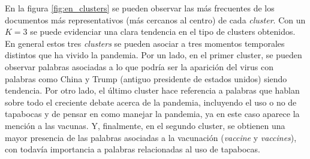 En la figura \ref{fig:en_clusters} se pueden observar las más frecuentes de los documentos más representativos (más cercanos al centro) de cada \textit{cluster}. Con un $K = 3$ se puede evidenciar una clara tendencia en el tipo de clusters obtenidos. En general estos tres \textit{clusters} se pueden asociar a tres momentos temporales distintos que ha vivido la pandemia. Por un lado, en el primer cluster, se pueden observar palabras asociadas a lo que podría ser la aparición del virus con palabras como China y Trump (antiguo presidente de estados unidos) siendo tendencia. Por otro lado, el último cluster hace referencia a palabras que hablan sobre todo el creciente debate acerca de la pandemia, incluyendo el uso o no de tapabocas y de pensar en como manejar la pandemia, ya en este caso aparece la mención a las vacunas. Y, finalmente, en el segundo cluster, se obtienen una mayor presencia de las palabras asociadas a la vacunación  (\textit{vaccine} y \textit{vaccines}), con todavía importancia a palabras relacionadas al uso de tapabocas.

